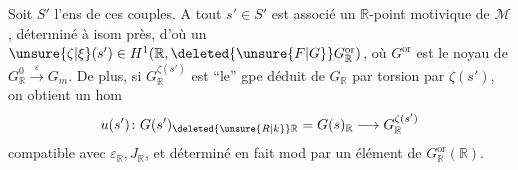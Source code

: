  Soit $S'$ l'ens de ces couples. A tout $s'\in S'$ est associé un $\mathbb R$-point motivique de $\mathcal M$,  déterminé à isom près, d'où un $\unsure{\zeta|\xi}(s')\in H^1(\mathbb R,\deleted{\unsure{F|G}}G_{\mathbb R}^{\mathrm{or}})$, où $G^{\mathrm{or}}$ est le noyau de $G_{\mathbb R}^0\xrightarrow{\varepsilon}G_m$. De plus, si $G_{\mathbb R}^{\zeta(s')}$ est ``le'' gpe déduit de $G_{\mathbb R}$ par torsion par $\zeta(s')$, on obtient un hom
\[
u(s')\colon G(s')_{\deleted{\unsure{R|k}}\mathbb R}=G(s)_{\mathbb R}\longrightarrow G_{\mathbb R}^{\zeta(s')}
\]
compatible avec $\varepsilon_{\mathbb R},J_{\mathbb R}$, et déterminé en fait mod    par un élément de $G_{\mathbb R}^{\mathrm{or}}(\mathbb R)$.
